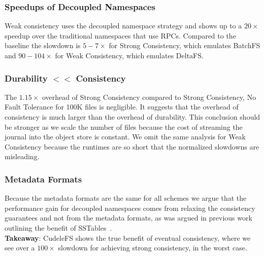 \subsubsection{Speedups of Decoupled Namespaces} Weak consistency uses the
decoupled namespace strategy and shows up to a \(20\times\) speedup over the
traditional namespaces that use RPCs. Compared to the baseline the slowdown is
\(5-7\times\) for Strong Consistency, which emulates BatchFS and
\(90-104\times\) for Weak Consistency, which emulates DeltaFS.

\subsubsection{Durability \(<<\) Consistency} The \(1.15\times\) overhead of
Strong Consistency compared to Strong Consistency, No Fault Tolerance for
100K files is negligible. It suggests that the overhead of consistency is much
larger than the overhead of durability. This conclusion should be stronger as
we scale the number of files because the cost of streaming the journal into the
object store is constant. We omit the same analysis for Weak Consistency
because the runtimes are so short that the normalized slowdowns are misleading.

\subsubsection{Metadata Formats} Because the metadata formats are the same for
all schemes we argue that the performance gain for decoupled namespaces comes
from relaxing the consistency guarantees and not from the metadata formats, as
was argued in previous work outlining the benefit of
SSTables~\cite{ren:atc2013-tablefs, ren:sc2014-indexfs}.\\

\noindent\textbf{Takeaway}: CudeleFS shows the true benefit of eventual
consistency, where we see over a \(100\times\) slowdown for achieving strong
consistency, in the worst case.

